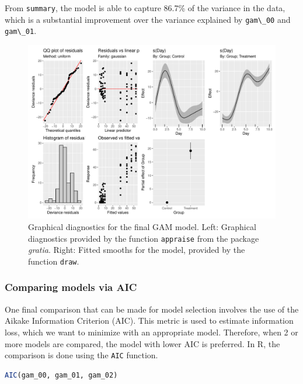 \documentclass[
]{article}
\newcommand{\passthrough}[1]{#1}
\begin{document}
From \passthrough{\lstinline!summary!}, the model is able to capture 86.7\% of the variance in the data, which is a substantial improvement over the variance explained by \passthrough{\lstinline!gam\_00!} and \passthrough{\lstinline!gam\_01!}.



\begin{figure}

{\centering \includegraphics[width=0.75\linewidth]{Appendix_A_files/figure-latex/final-GAM-diag-1} 

}

\caption{Graphical diagnostics for the final GAM model. Left: Graphical diagnostics provided by the function \passthrough{\lstinline!appraise!} from the package \emph{gratia}. Right: Fitted smooths for the model, provided by the function \passthrough{\lstinline!draw!}.}\label{fig:final-GAM-diag}
\end{figure}

\hypertarget{comparing-models-via-aic}{%
\subsubsection{Comparing models via AIC}\label{comparing-models-via-aic}}

One final comparison that can be made for model selection involves the use of the Aikake Information Criterion (AIC). This metric is used to estimate information loss, which we want to minimize with an appropriate model. Therefore, when 2 or more models are compared, the model with lower AIC is preferred. In R, the comparison is done using the \passthrough{\lstinline!AIC!} function.

\begin{lstlisting}[language=R]
AIC(gam_00, gam_01, gam_02)
\end{lstlisting}
\end{document}
